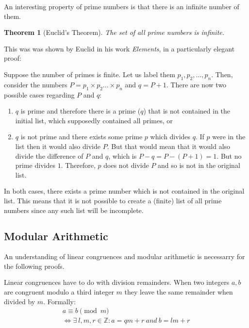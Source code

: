 \documentclass[12pt, titlepage]{article}
\newtheorem{theorem}{Theorem}
\begin{document}
    An interesting property of prime numbers is that there is an infinite number of them. 
    \begin{theorem}[Euclid's Theorem]
        The set of all prime numbers is infinite.
    \end{theorem}
%
    This was was shown by Euclid in his work \emph{Elements}, in a particularly elegant
    proof:

    Suppose the number of primes is finite. Let us label them $p_1, p_2, ..., p_n$. Then,
    consider the numbers $P = p_1\times p_2 ... \times p_n$ and $q = P + 1$. There are now
    two possible cases regarding $P$ and $q$:
    \begin{enumerate}[label=\alph*)]
        \item $q$ is prime and therefore there is a prime ($q$) that is not contained in the
            initial list, which supposedly contained all primes, or
        \item $q$ is not prime and there exists some prime $p$ which divides $q$. If $p$
            were in the list then it would also divide $P$. But that would mean that it
            would also divide the difference of $P$ and $q$, which is $P - q = P - (P + 1) =
            1$. But no prime divides $1$.  Therefore, $p$ does not divide $P$ and so is not
            in the original list.
    \end{enumerate}
    In both cases, there exists a prime number which is not contained in the original list.
    This means that it is not possible to create a (finite) list of all prime numbers since
    any such list will be incomplete.
        

    \subsection{Modular Arithmetic}
    An understanding of linear congruences and modular arithmetic is necessarry for the
    following proofs.

    Linear congruences have to do with division remainders. When two integers $a, b$ are
    congruent modulo a third integer $m$ they leave the same remainder when divided by $m$.
    Formally:
    \begin{equation}\label{eq:congr_def_long}
        \begin{gathered}
            a \equiv b \pmod{m} \\
            \iff \exists\ l,m,r \in \mathbb{Z}: a = qm + r\ and\ b = lm + r
        \end{gathered}
    \end{equation}
\end{document}
